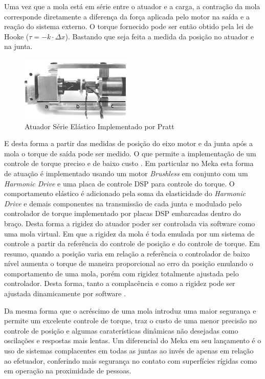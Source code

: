 Uma vez que a mola está em série entre o atuador e a carga, a contração da mola corresponde diretamente a diferença da força aplicada pelo motor na saída e a reação do sistema externo. O torque fornecido pode ser então obtido pela lei de Hooke ($\tau = -k\cdot \Delta x$). Bastando que seja feita a medida da posição no atuador e na junta.

\begin{figure}[H]
    \centering
    \includegraphics[width=0.6\linewidth]{tex/figs/sea_pratt_desc.png}
    \caption{Atuador Série Elástico Implementado por Pratt \cite{pratt1997stiffness}}
    \label{fig:seapratt}
\end{figure}

E desta forma a partir das medidas de posição do eixo motor e da junta após a mola o torque de saída pode ser medido. O que permite a implementação de um controle de torque preciso e de baixo custo \cite{pratt1997stiffness}. Em particular no Meka esta forma de atuação é implementado usando um motor \textit{Brushless} em conjunto com um \textit{Harmonic Drive} e uma placa de controle DSP para controle do torque. O comportamento elástico é adicionado pela soma da elasticidade do \textit{Harmonic Drive} e demais componentes na transmissão de cada junta e modulado pelo controlador de torque implementado por placas DSP embarcadas dentro do braço. Desta forma a rigidez do atuador poder ser controlada via software como uma mola virtual. Em que a rigidez da mola é toda emulada por um sistema de controle a partir da referência do controle de posição e do controle de torque. Em resumo, quando a posição varia em relação a referência o controlador de baixo nível aumenta o torque de maneira proporcional ao erro da posição emulando o comportamento de uma mola, porém com rigidez totalmente ajustada pelo controlador. Desta forma, tanto a complacência e como a rigidez pode ser ajustada dinamicamente por software \cite{abeyrathna2013simulation}.

Da mesma forma que o acréscimo de uma mola introduz uma maior segurança e permite um excelente controle de torque, traz o custo de uma menor precisão no controle de posição e algumas caraterísticas dinâmicas não desejadas como oscilações e respostas mais lentas. Um diferencial do Meka em seu lançamento é o uso de sistemas complacentes em todas as juntas ao invés de apenas em relação ao efetuador, conferindo mais segurança no contato com superfícies rígidas como em operação na proximidade de pessoas.

